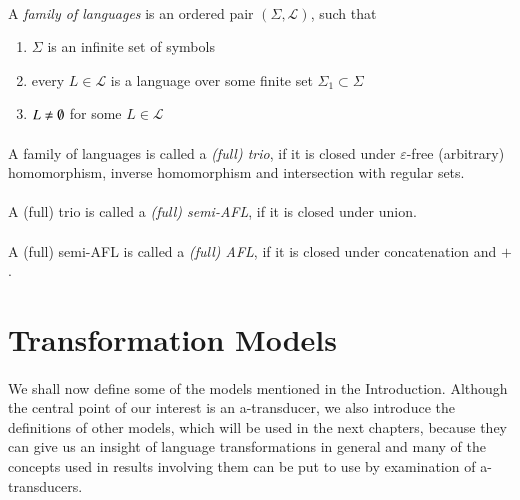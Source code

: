 \paragraph{}
 A \emph{family of languages} is an ordered pair $(\Sigma ,\mathcal{L} )$, such that
\begin{enumerate}
\item $\Sigma $ is an infinite set of symbols
\item every $L\in \mathcal{L} $ is a language over some finite set $\Sigma_1 \subset \Sigma $
\item $L \neq \es $ for some $L \in \mathcal{L} $
\end{enumerate}

\paragraph{}
 A family of languages is called a \emph{(full) trio}, if it is closed under $\varepsilon $-free (arbitrary) homomorphism, inverse homomorphism and intersection with regular sets.

\paragraph{}
 A (full) trio is called a \emph{(full) semi-AFL}, if it is closed under union.

\paragraph{}
 A (full) semi-AFL is called a \emph{(full) AFL}, if it is closed under concatenation and $+$.

\section{Transformation Models}
\paragraph{}
We shall now define some of the models mentioned in the Introduction. Although the central point of our interest is an a-transducer, we also introduce the definitions of other models, which will be used in the next chapters, because they can give us an insight of language transformations in general and many of the concepts used in results involving them can be put to use by examination of a-transducers.

